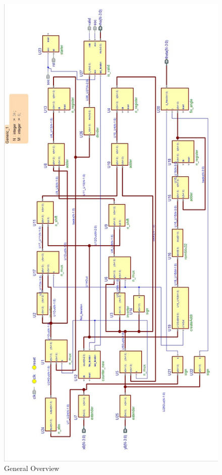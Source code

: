 \documentclass[12pt,a4paper]{report}
\begin{document}
\begin{figure}
\centering
\includegraphics[scale=0.52]{img/blockCordic.jpg}
\caption{General Overview\label{fig:block}}
\end{figure}
\end{document}
